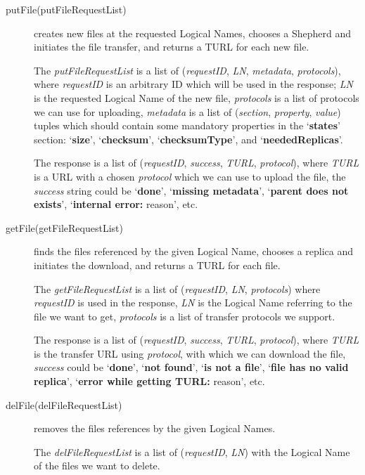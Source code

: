 \documentclass{book}
\begin{document}
\begin{description}

    \item[putFile(putFileRequestList)] creates new files at the requested Logical Names, chooses a Shepherd and initiates the file transfer, and returns a TURL for each new file.
        
    The \emph{putFileRequestList} is a list of (\emph{requestID}, \emph{LN}, \emph{metadata}, \emph{protocols}), where \emph{requestID} is an arbitrary ID which will be used in the response; \emph{LN} is the requested Logical Name of the new file, \emph{protocols} is a list of protocols we can use for uploading, \emph{metadata} is a list of (\emph{section}, \emph{property}, \emph{value}) tuples which should contain some mandatory properties in the `\textbf{states}' section: `\textbf{size}', `\textbf{checksum}', `\textbf{checksumType}', and  `\textbf{neededReplicas}'. 

    The response is a list of (\emph{requestID}, \emph{success}, \emph{TURL}, \emph{protocol}), where \emph{TURL} is a URL with a chosen \emph{protocol} which we can use to upload the file, the \emph{success} string could be `\textbf{done}', `\textbf{missing metadata}', `\textbf{parent does not exists}', `\textbf{internal error:} reason', etc.

    \item[getFile(getFileRequestList)] finds the files referenced by the given Logical Name, chooses a replica and initiates the download, and returns a TURL for each file.
    
    The \emph{getFileRequestList} is a list of (\emph{requestID}, \emph{LN}, \emph{protocols}) where \emph{requestID} is used in the response, \emph{LN} is the Logical Name referring to the file we want to get, \emph{protocols} is a list of transfer protocols we support.
    
    The response is a list of (\emph{requestID}, \emph{success}, \emph{TURL}, \emph{protocol}), where \emph{TURL} is the transfer URL using \emph{protocol}, with which we can download the file, \emph{success} could be `\textbf{done}', `\textbf{not found}', `\textbf{is not a file}', `\textbf{file has no valid replica}', `\textbf{error while getting TURL:} reason', etc.

    \item[delFile(delFileRequestList)] removes the files references by the given Logical Names.

    The \emph{delFileRequestList} is a list of (\emph{requestID}, \emph{LN}) with the Logical Name of the files we want to delete. 
    

\end{description}
\end{document}
